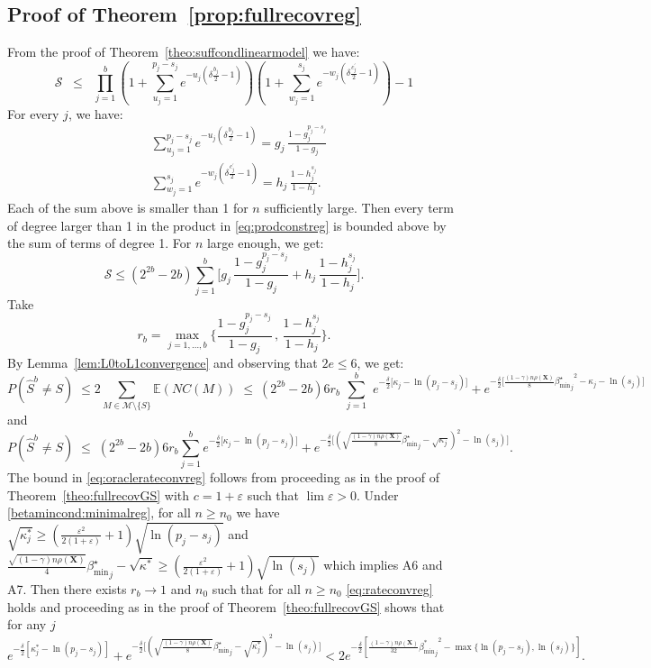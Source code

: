 \documentclass[aos]{imsart}
\theoremstyle{plain}
\newcommand{\E}{\mathbb{E}}
\newcommand{\bs}{\boldsymbol}
\begin{document}
\begin{supplement}
\subsection{Proof of Theorem~\ref{prop:fullrecovreg}}
From the proof of Theorem~\ref{theo:suffcondlinearmodel} we have:
\begin{equation}\label{eq:prodconstreg}
    \mathcal{S} \;\;\leq\;\; \prod_{j=1}^b\left(1+\sum_{u_j=1}^{p_j-s_j}e^{-u_j\left(\delta \tfrac{b_j}{2}-1\right)}\right)\left(1+
    \sum_{w_j=1}^{s_j}    e^{-w_j\left(\delta \tfrac{c^{\prime}_j}{2}-1\right)}\right) - 1
\end{equation}
For every $j$, we have:
\begin{align*}
    &\sum_{u_j=1}^{p_j-s_j}e^{-u_j\left(\delta \tfrac{b_j}{2}-1\right)}
    =g_j\,\frac{1-g_j^{p_j-s_j}}{1-g_j} \\
    &\sum_{w_j=1}^{s_j}    e^{-w_j\left(\delta \tfrac{c^{\prime}_j}{2}-1\right)} =h_j\,\frac{1-h_j^{s_j}}{1-h_j}.
\end{align*}
Each of the sum above is smaller than 1 for $n$ sufficiently large. Then every term of degree larger than 1 in the product in \eqref{eq:prodconstreg} is bounded above by the sum of terms of degree 1. For $n$ large enough, we get: 
 \begin{equation*} \mathcal{S} \leq (2^{2b}-2b)\sum_{j=1}^b \bigg[g_j\,\frac{1-g_j^{p_j-s_j}}{1-g_j}+ h_j\,\frac{1-h_j^{s_j}}{1-h_j}\bigg ]. \end{equation*} 
 Take $$r_b=\max_{j=1,\ldots,b}\bigg\{\frac{1-g_j^{p_j-s_j}}{1-g_j} \,,\,\frac{1-h_j^{s_j}}{1-h_j} \bigg\}.$$
 By Lemma~\ref{lem:L0toL1convergence} and observing that $2e \leq 6$, we get: 
 $$ P(\hat{S}^{b} \neq S)\;\leq  2 \sum_{M \in \mathcal{M}\setminus \{S\}} \E\left(NC(M)\right) \;\leq\ (2^{2b}-2b)6r_b\,\,\sum_{j=1}^b\,\, e^{-\tfrac{\delta}{2}\big[\kappa_j-\ln(p_j-s_j)\big]} + e^{-\tfrac{\delta}{2}\big[\frac{(1-\gamma) n\rho(\bs X)}{8}{{\beta_{\min}^{\star}}_j}^2 - \kappa_j -\ln(s_j) \big]} $$ and 
 $$ P(\hat{S}^{b} \neq S)\;\leq \;(2^{2b}-2b)6r_b\sum_{j=1}^b e^{-\tfrac{\delta}{2}\big[\kappa_j-\ln(p_j-s_j)\big]} + e^{-\frac{\delta}{2}\big[(\sqrt{\frac{(1-\gamma) n\rho(\bs X)}{8}}{{\beta_{\min}^{\star}}_j} - \sqrt{\kappa_j})^2 -\ln(s_j) \big]}.$$
     The bound in \eqref{eq:oraclerateconvreg} follows from proceeding as in the proof of Theorem~\ref{theo:fullrecovGS} with $c=1+\varepsilon$ such that $\lim \varepsilon > 0$. Under \eqref{betamincond:minimalreg}, for all $n\geq n_0$  we have $\sqrt{\kappa^*_j} \geq  (\frac{\varepsilon^2}{2(1+\varepsilon)}+1)\sqrt{\ln(p_j-s_j)}$ and $\frac{\sqrt{(1-\gamma) n\rho(\bs X)}}{4}{{\beta_{\min}^{\star}}_j}-\sqrt{\kappa^*} \geq (\frac{\varepsilon^2}{2(1+\varepsilon)}+1)\sqrt{\ln(s_j)}$
    which implies A6 and A7. Then there exists $r_b\to 1$ and $n_0$ such that for all $n\geq n_0$ \eqref{eq:rateconvreg} holds and proceeding as in the proof of Theorem~\ref{theo:fullrecovGS} shows that for any $j$ 
    $$e^{-\frac{\delta}{2}\left[{\kappa^*_j}-\ln(p_j-s_j)\right]}+e^{-\frac{\delta}{2}\big[(\sqrt{\frac{(1-\gamma) n\rho(\bs X)}{8}}{{\beta_{\min}^{\star}}_j} - \sqrt{\kappa_j^*})^2 -\ln(s_j) \big]} <2 e^{-\frac{\delta}{2}[\frac{(1-\gamma) n\rho(\bs X)}{32}{{\beta_{\min}^*}_j}^2-\max\{\ln(p_j-s_j),\ln(s_j)\}]}. $$


\end{supplement}
\end{document}
